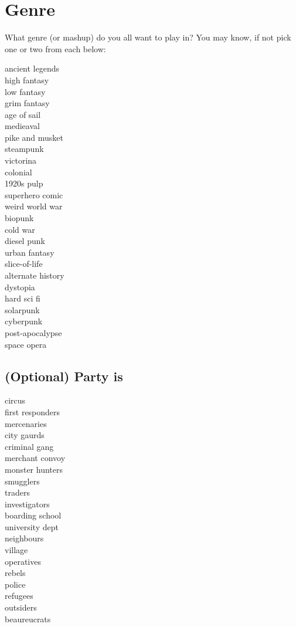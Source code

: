 \documentclass{tufte-handout}
\begin{document}
\section{Genre}
What genre (or mashup) do you all want to play in?
You may know, if not pick one or two from each below:
\begin{multicols}{3}
ancient legends\\
high fantasy\\
low fantasy\\
grim fantasy\\
age of sail\\
medieaval\\
pike and musket\\
steampunk\\
victorina\\
colonial\\
1920s pulp\\
superhero comic\\
weird world war\\
biopunk\\
cold war\\
diesel punk\\
urban fantasy\\
slice-of-life\\
alternate history\\
dystopia\\
hard sci fi\\
solarpunk\\
cyberpunk\\
post-apocalypse\\
space opera\\
\end{multicols}

\subsection{(Optional) Party is}
\begin{multicols}{3}
circus\\
first responders\\
mercenaries\\
city gaurds\\
criminal gang\\
merchant convoy\\
monster hunters\\
smugglers\\
traders\\
investigators\\
boarding school\\
university dept\\
neighbours\\
village\\
operatives\\
rebels\\
police\\
refugees\\
outsiders\\
beaureucrats\\
\end{multicols}
\end{document}
